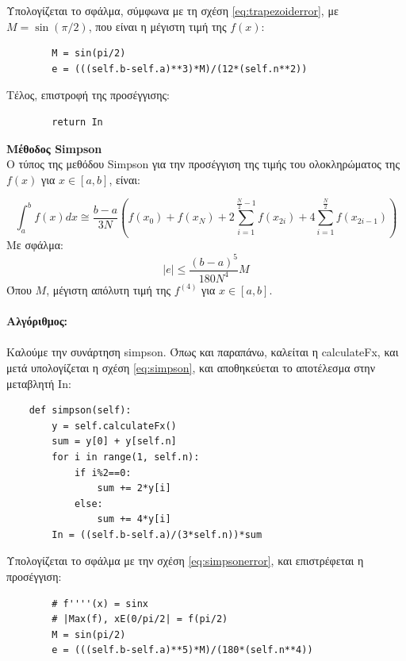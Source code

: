 \documentclass[a4paper,11pt]{article}
\newcommand{\lt}{\latintext}
\newcommand{\gt}{\greektext}
\begin{document}
{\begin{description}
Υπολογίζεται το σφάλμα, σύμφωνα με τη σχέση \eqref{eq:trapezoiderror}, με $M=\sin(\pi/2)$, που είναι η μέγιστη τιμή της $f(x)$:  

    \lt
    \begin{verbatim}
        M = sin(pi/2)
        e = (((self.b-self.a)**3)*M)/(12*(self.n**2))
    \end{verbatim}
    \gt
    
Τέλος, επιστροφή της προσέγγισης: 

    \lt
    \begin{verbatim}
        return In
    \end{verbatim}
    \gt

\item[β)]{\textbf{Μέθοδος {\lt Simpson}}}\\
Ο τύπος της μεθόδου {\lt Simpson} για την προσέγγιση της τιμής του ολοκληρώματος της $f(x)$ για $x\in[a,b]$, είναι:

\begin{equation}
    \int_{a}^{b}f(x)dx \cong \frac{b-a}{3N}(f(x_0)+f(x_N) + 2\sum_{i=1}^{\frac{N}{2}-1}f(x_{2i}) + 4\sum_{i=1}^{\frac{N}{2}}f(x_{2i-1})) \tag{6.3}\label{eq:simpson}
\end{equation}
Με σφάλμα: 
\begin{equation}
    |e| \leq \frac{(b-a)^5}{180N^4}M  \tag{6.4}\label{eq:simpsonerror}
\end{equation}
Όπου $M$, μέγιστη απόλυτη τιμή της $f^{(4)}$ για  $x\in[a,b]$.\\\\

\textbf{Αλγόριθμος:}\\\\
Καλούμε την συνάρτηση {\lt simpson}. Όπως και παραπάνω, καλείται η {\lt calculateFx}, και μετά υπολογίζεται η σχέση \eqref{eq:simpson}, και αποθηκεύεται το αποτέλεσμα στην μεταβλητή {\lt In}:

    \lt
    \begin{verbatim}
    def simpson(self):
        y = self.calculateFx()
        sum = y[0] + y[self.n]
        for i in range(1, self.n):
            if i%2==0:
                sum += 2*y[i]
            else:
                sum += 4*y[i]
        In = ((self.b-self.a)/(3*self.n))*sum
    \end{verbatim}
    \gt
\newpage
Υπολογίζεται το σφάλμα με την σχέση \eqref{eq:simpsonerror}, και επιστρέφεται η προσέγγιση:

    \lt
    \begin{verbatim}
        # f''''(x) = sinx
        # |Max(f), xE(0/pi/2| = f(pi/2)
        M = sin(pi/2)
        e = (((self.b-self.a)**5)*M)/(180*(self.n**4))


\end{verbatim}
\end{description}}
\end{document}
